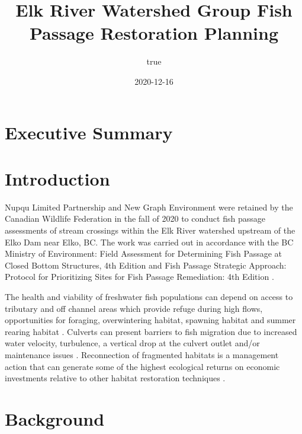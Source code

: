 \documentclass[
]{book}
\title{Elk River Watershed Group Fish Passage Restoration Planning}
\author{true}
\date{2020-12-16}
\begin{document}
\maketitle

{
\setcounter{tocdepth}{1}
\tableofcontents
}
\newpage

\hypertarget{executive-summary}{%
\chapter*{Executive Summary}\label{executive-summary}}

\hypertarget{intro}{%
\chapter{Introduction}\label{intro}}

Nupqu Limited Partnership and New Graph Environment were retained by the Canadian Wildlife Federation in the fall of 2020 to conduct fish passage assessments of stream crossings within the Elk River watershed upstream of the Elko Dam near Elko, BC. The work was carried out in accordance with the BC Ministry of Environment: Field Assessment for Determining Fish Passage at Closed Bottom Structures, 4th Edition \citep{fish_passage_assessments} and Fish Passage Strategic Approach: Protocol for Prioritizing Sites for Fish Passage Remediation: 4th Edition \citep{fishpassagetechnicalworkinggroupFishPassageStrategic2014}.

The health and viability of freshwater fish populations can depend on access to tributary and off channel areas which provide refuge during high flows, opportunities for foraging, overwintering habitat, spawning habitat and summer rearing habitat \citep{Bramblett_2002, swalesRoleOffChannelPonds1989}. Culverts can present barriers to fish migration due to increased water velocity, turbulence, a vertical drop at the culvert outlet and/or maintenance issues \citep{slaneyFishHabitatRehabilitation1997}. Reconnection of fragmented habitats is a management action that can generate some of the highest ecological returns on economic investments relative to other habitat restoration techniques \citep{saldicaromileStreamHabitatRestoration2004}.

\hypertarget{background}{%
\chapter{Background}\label{background}}
\end{document}
